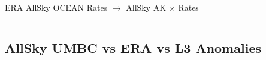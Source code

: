 \documentclass[10pt,t]{beamer}
\begin{document}
\begin{frame}{ERA AllSky OCEAN Rates $\rightarrow$ AllSky AK $\times$ Rates}
\begin{columns}
\begin{column}{0.45\columnwidth}

\end{column}
\end{columns}
\end{frame}


\subsection{AllSky UMBC vs ERA vs L3 Anomalies}
\end{document}
